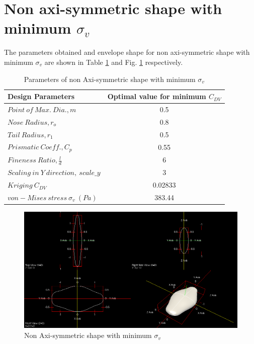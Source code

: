 \section{Non axi-symmetric shape with minimum $ \sigma_{v}$}

The parameters obtained and envelope shape for non axi-symmetric shape with minimum $ \sigma_{v}$ are shown in Table \ref{min_hoop_table} and Fig. \ref{min_hoop_fig} respectively.

\begin{table}[H]
	\centering
	\caption{Parameters of non Axi-symmetric shape with minimum $ \sigma_{v}$}
	\label{min_hoop_table}
	\begin{tabular}{lc}
		\hline \hline
		Design Parameters & Optimal value for minimum $ C_{DV} $    \\ \hline \hline
		$ Point\ of\ Max.\ Dia., m$ & 0.5      \\  
		$ Nose\ Radius, r _{o} $ & 0.8    \\
		$ Tail\ Radius, r _{1} $ & 0.5     \\  
		$ Prismatic\ Coeff., C _{p }$ & 0.55 \\
		$ Fineness\ Ratio, \frac{l}{d} $ &6 \\
		$Scaling\ in\ Y\ direction,\ scale\_y$ & 3 \\ \hline \hline
		
		
		$ Kriging\ C_{DV} $ & 0.02833
		 \\
		$ von-Mises\ stress\  \sigma _{v} \ (Pa) $ & 383.44 \\
		
		\hline \hline
	\end{tabular}
\end{table}

\begin{figure}[H]
	\centering
	\includegraphics[width=450 pt]{rnd/min_von_mises.png}
	\caption{Non Axi-symmetric shape with minimum $ \sigma_{v}$}
	\label{min_hoop_fig}
\end{figure}

